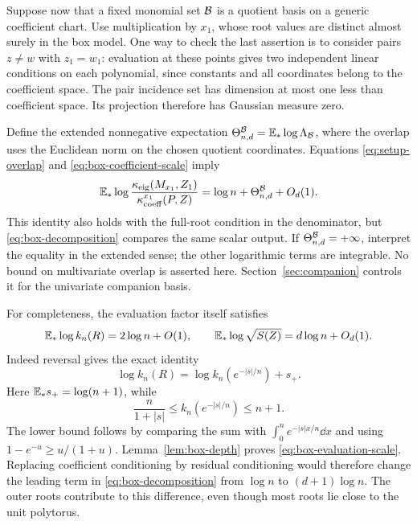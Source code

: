 Suppose now that a fixed monomial set $\mathcal B$ is a quotient basis on a generic
coefficient chart. Use multiplication by $x_1$, whose root values are distinct
almost surely in the box model. One way to check the last assertion is to
consider pairs $z\ne w$ with $z_1=w_1$: evaluation at these points gives two
independent linear conditions on each polynomial, since constants and all
coordinates belong to the coefficient space. The pair incidence set has
dimension at most one less than coefficient space. Its projection therefore
has Gaussian measure zero.

Define the extended nonnegative expectation
$\Theta_{n,d}^{\mathcal B}=\mathbb E_*\log\Lambda_{\mathcal B}$, where the overlap uses the
Euclidean norm on the chosen quotient coordinates. Equations
\eqref{eq:setup-overlap} and \eqref{eq:box-coefficient-scale} imply
\begin{equation}\label{eq:box-decomposition}
 \mathbb E_*\log\frac{\kappa_{\mathrm{eig}}(M_{x_1},Z_1)}
                     {\kappa_{\mathrm{coeff}}^{x_1}(P,Z)}
 =\log n+\Theta_{n,d}^{\mathcal B}+O_d(1).
\end{equation}
This identity also holds with the full-root condition in the denominator,
but \eqref{eq:box-decomposition} compares the same scalar output.
If $\Theta_{n,d}^{\mathcal B}=+\infty$, interpret the equality in the extended sense;
the other logarithmic terms are integrable. No bound on multivariate overlap
is asserted here. Section~\ref{sec:companion} controls it for the univariate
companion basis.

For completeness, the evaluation factor itself satisfies
\begin{equation}\label{eq:box-evaluation-scale}
 \mathbb E_*\log k_n(R)=2\log n+O(1),\qquad
 \mathbb E_*\log\sqrt{S(Z)}=d\log n+O_d(1).
\end{equation}
Indeed reversal gives the exact identity
\[
 \log k_n(R)=\log k_n(e^{-|s|/n})+s_+.
\]
Here $\mathbb E_* s_+=\log(n+1)$, while
\[
 \frac{n}{1+|s|}\le k_n(e^{-|s|/n})\le n+1.
\]
The lower bound follows by comparing the sum with
$\int_0^n e^{-|s|x/n}\dd x$ and using $1-e^{-u}\ge u/(1+u)$.
Lemma~\ref{lem:box-depth} proves \eqref{eq:box-evaluation-scale}.
Replacing coefficient conditioning by residual conditioning would therefore
change the leading term in \eqref{eq:box-decomposition} from $\log n$ to
$(d+1)\log n$. The outer roots contribute to this difference, even though
most roots lie close to the unit polytorus.
